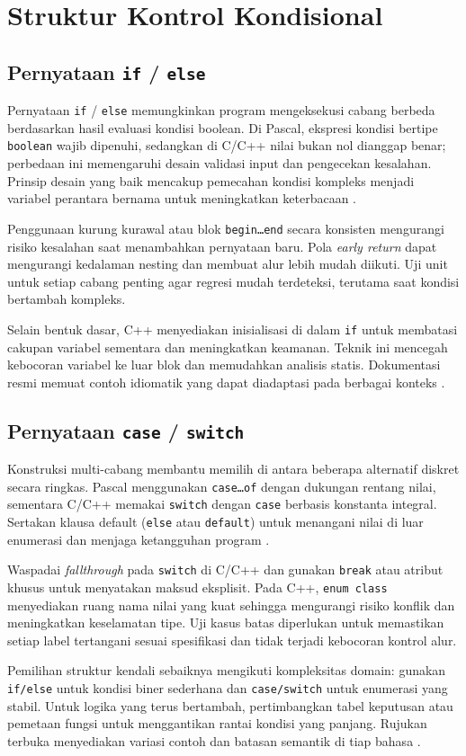 \documentclass[../main.tex]{subfiles}
\begin{document}
\chapter{Struktur Kontrol Kondisional}
\section{Pernyataan \texttt{if} / \texttt{else}}
Pernyataan \texttt{if} / \texttt{else} memungkinkan program mengeksekusi cabang berbeda berdasarkan hasil evaluasi kondisi boolean. Di Pascal, ekspresi kondisi bertipe \texttt{boolean} wajib dipenuhi, sedangkan di C/C++ nilai bukan nol dianggap benar; perbedaan ini memengaruhi desain validasi input dan pengecekan kesalahan. Prinsip desain yang baik mencakup pemecahan kondisi kompleks menjadi variabel perantara bernama untuk meningkatkan keterbacaan \parencite{pascal-tutorial-wikibooks,gnu-c-manual,cpp-reference}.

Penggunaan kurung kurawal atau blok \texttt{begin\ldots end} secara konsisten mengurangi risiko kesalahan saat menambahkan pernyataan baru. Pola \emph{early return} dapat mengurangi kedalaman nesting dan membuat alur lebih mudah diikuti. Uji unit untuk setiap cabang penting agar regresi mudah terdeteksi, terutama saat kondisi bertambah kompleks.

Selain bentuk dasar, C++ menyediakan inisialisasi di dalam \texttt{if} untuk membatasi cakupan variabel sementara dan meningkatkan keamanan. Teknik ini mencegah kebocoran variabel ke luar blok dan memudahkan analisis statis. Dokumentasi resmi memuat contoh idiomatik yang dapat diadaptasi pada berbagai konteks \parencite{cpp-reference}.

\section{Pernyataan \texttt{case} / \texttt{switch}}
Konstruksi multi-cabang membantu memilih di antara beberapa alternatif diskret secara ringkas. Pascal menggunakan \texttt{case\ldots of} dengan dukungan rentang nilai, sementara C/C++ memakai \texttt{switch} dengan \texttt{case} berbasis konstanta integral. Sertakan klausa default (\texttt{else} atau \texttt{default}) untuk menangani nilai di luar enumerasi dan menjaga ketangguhan program \parencite{pascal-tutorial-wikibooks,gnu-c-manual,cpp-reference}.

Waspadai \emph{fallthrough} pada \texttt{switch} di C/C++ dan gunakan \texttt{break} atau atribut khusus untuk menyatakan maksud eksplisit. Pada C++, \texttt{enum class} menyediakan ruang nama nilai yang kuat sehingga mengurangi risiko konflik dan meningkatkan keselamatan tipe. Uji kasus batas diperlukan untuk memastikan setiap label tertangani sesuai spesifikasi dan tidak terjadi kebocoran kontrol alur.

Pemilihan struktur kendali sebaiknya mengikuti kompleksitas domain: gunakan \texttt{if/else} untuk kondisi biner sederhana dan \texttt{case/switch} untuk enumerasi yang stabil. Untuk logika yang terus bertambah, pertimbangkan tabel keputusan atau pemetaan fungsi untuk menggantikan rantai kondisi yang panjang. Rujukan terbuka menyediakan variasi contoh dan batasan semantik di tiap bahasa \parencite{pascal-tutorial-wikibooks,gnu-c-manual,cpp-reference}.
\end{document}
